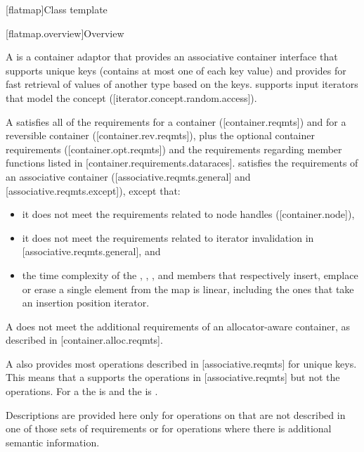 \setcounter{subsection}{7}
\begin{addedblock}
[flatmap]{Class template }

[flatmap.overview]{Overview}

\pnum
{}%
A  is a container adaptor that provides an associative
container interface that supports unique keys (contains at most one of each
key value) and provides for fast retrieval of values of another type 
based on the keys.  supports input iterators that model
the  concept
([iterator.concept.random.access]).

\pnum
A  satisfies all of the requirements for a container
([container.reqmts]) and for a reversible container ([container.rev.reqmts]),
plus the optional container requirements ([container.opt.reqmts]) and the
requirements regarding  member functions listed in
[container.requirements.dataraces].   satisfies the
requirements of an associative container ([associative.reqmts.general] and
[associative.reqmts.except]), except that:
\begin{itemize}
\item it does not meet the requirements related to node handles ([container.node]),
\item it does not meet the requirements related to iterator invalidation in [associative.reqmts.general], and
\item the time complexity of the , , ,
and  members that respectively insert, emplace or erase a single
element from the map is linear, including the ones that take an insertion
position iterator.
\end{itemize}
A  does not meet the additional requirements of an
allocator-aware container, as described in [container.alloc.reqmts].

\pnum
A  also provides most operations described
in [associative.reqmts] for unique keys.  This means that a
 supports the  operations
in [associative.reqmts] but not the  operations.  For
a  the  is  and the
 is .

\pnum
Descriptions are provided here only for operations on  that
are not described in one of those sets of requirements or for operations where
there is additional semantic information.


\end{addedblock}
